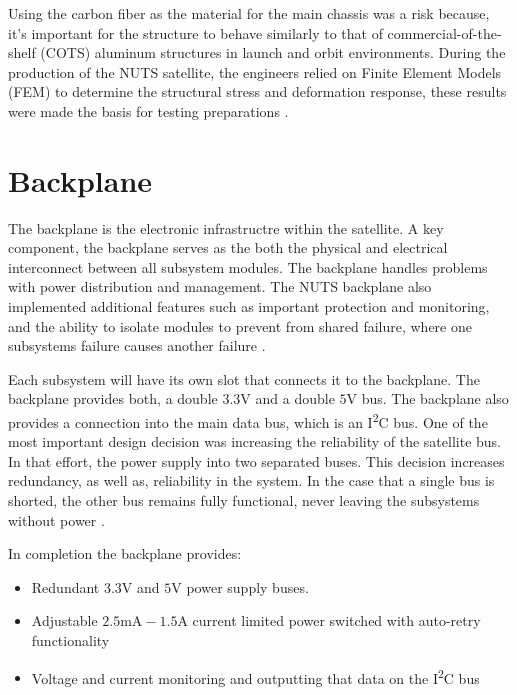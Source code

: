 \documentclass[12pt, a4paper]{report}
\begin{document}
Using the carbon fiber as the material for the main chassis was a risk because, it's important for the structure to behave similarly to that of commercial-of-the-shelf (COTS) aluminum structures in launch and orbit environments. During the production of the NUTS satellite, the engineers relied on Finite Element Models (FEM) to determine the structural stress and deformation response, these results were made the basis for testing preparations \cite{overview}.

\section{Backplane}

The backplane is the electronic infrastructre within the satellite. A key component, the backplane serves as the both the physical and electrical interconnect between all subsystem modules. The backplane handles problems with power distribution and management. The NUTS backplane also implemented additional features such as important protection and monitoring, and the ability to isolate modules to prevent from shared failure, where one subsystems failure causes another failure \cite{power_distribution}. 

Each subsystem will have its own slot that connects it to the backplane. The backplane provides both, a double \(3.3 \unit{\volt}\) and a double \(5 \unit{\volt}\) bus. The backplane also provides a connection into the main data bus, which is an I\textsuperscript{2}C bus. One of the most important design decision was increasing the reliability of the satellite bus. In that effort, the power supply into two separated buses. This decision increases redundancy, as well as, reliability in the system. In the case that a single bus is shorted, the other bus remains fully functional, never leaving the subsystems without power \cite{overview}. 

In completion the backplane provides:

\begin{itemize}
    \item Redundant \(3.3 \unit{\volt}\) and \(5 \unit{\volt}\) power supply buses.
    \item Adjustable \(2.5 \unit{\milli\ampere} - 1.5 \unit{\ampere}\) current limited power switched with auto-retry functionality \cite{power_distribution}
    \item Voltage and current monitoring and outputting that data on the I\textsuperscript{2}C bus
\end{itemize}
\end{document}
